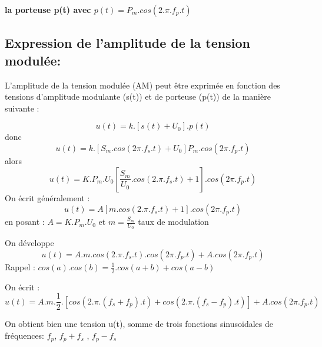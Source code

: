 \documentclass[12pt]{article}
\begin{document}

\textbf{la porteuse p(t) avec $p(t) = P_m.cos(2.\pi.f_p.t)$}

\subsection{Expression de l'amplitude de la tension modulée:}

L'amplitude de la tension modulée (AM) peut être exprimée en fonction des tensions d'amplitude modulante (s(t)) et de porteuse (p(t)) de la manière suivante :

$$u(t) =  k.[s(t)+U_0].p(t)$$
donc $$u(t) = k.[S_m.cos(2\pi.f_s.t)+U_0]P_m.cos(2\pi.f_p.t)$$
alors $$u(t) = K.P_m.U_0[\frac{S_m}{U_0}.cos(2.\pi.f_s.t) + 1].cos(2\pi.f_p.t)$$
On écrit généralement : $$u(t) = A[m.cos(2.\pi.f_s.t) + 1].cos(2\pi.f_p.t)$$
en posant : $A = K.P_m.U_0$ et $m = \frac{S_m}{U_0}$ taux de modulation

On développe $$u(t) = A.m.cos(2.\pi.f_s.t).cos(2\pi.f_p.t) + A.cos(2\pi.f_p.t) $$
Rappel : $cos(a).cos(b) = \frac{1}{2}.cos(a+b) + cos(a-b)$


On écrit  : $$u(t) = A.m.\frac{1}{2}.[cos(2.\pi.(f_s + f_p).t) + cos(2.\pi.(f_s - f_p).t)]  + A.cos(2\pi.f_p.t) $$

On obtient bien une tension u(t), somme de trois fonctions sinusoidales de fréquences: $f_p$, $f_p + f_s$ , $f_p-f_s$
\end{document}

